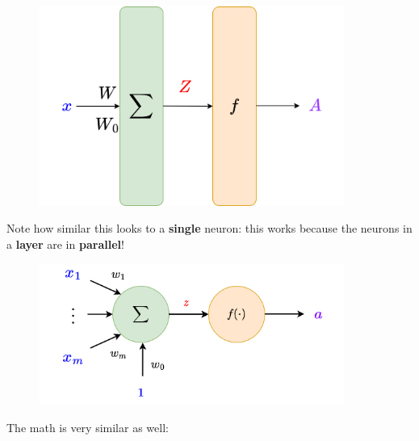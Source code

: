         \begin{figure}[H]
            \centering
            \includegraphics[width=100mm,scale=0.4]{images/nn_images/layer_simplified.png}
        \end{figure}
        
        Note how similar this looks to a \textbf{single} neuron: this works because the neurons in a \textbf{layer} are in \textbf{parallel}!
        
        \begin{figure}[H]
            \centering
            \includegraphics[width=100mm,scale=0.4]{images/nn_images/full_neuron.png}
        \end{figure}
        
        The math is very similar as well:\\
        

